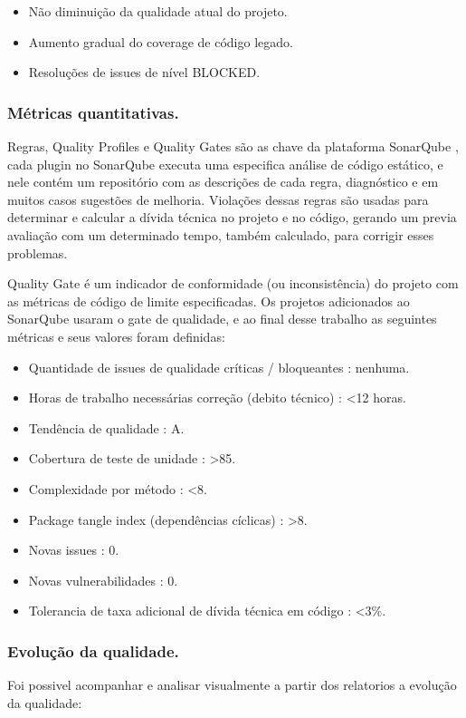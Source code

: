 \documentclass[12pt]{article}
\begin{document}
 \begin{itemize}
 	\item Não diminuição da qualidade atual do projeto.
 	\item Aumento gradual do coverage de código legado.
 	\item Resoluções de issues de nível BLOCKED.
 \end{itemize}

\subsubsection{Métricas quantitativas.} \label{sec:sonar-planning-mquantity}

Regras, Quality Profiles e Quality Gates são as chave da plataforma SonarQube \cite{SONARQUBE}, cada plugin no SonarQube executa uma especifica análise de código estático, e nele contém um repositório com as descrições de cada regra, diagnóstico e em muitos casos sugestões de melhoria.
Violações dessas regras são usadas para determinar e calcular a dívida técnica no projeto e no código, gerando um previa avaliação com um determinado tempo, também calculado, para corrigir esses problemas.

Quality Gate é um indicador de conformidade (ou inconsistência) do projeto com as métricas de código de limite especificadas\cite{SONARQUBE}. Os projetos adicionados ao SonarQube usaram o gate de qualidade, e ao final desse trabalho as seguintes métricas e seus valores foram definidas:

 \begin{itemize}
 	\item Quantidade de issues de qualidade críticas / bloqueantes : nenhuma.
 	\item Horas de trabalho necessárias correção (debito técnico) : \textless 12 horas.
 	\item Tendência de qualidade : A.
 	\item Cobertura de teste de unidade : \textgreater 85.
 	\item Complexidade por método : \textless 8.
 	\item Package tangle index (dependências cíclicas) : \textgreater 8.
	\item Novas issues : 0.
	\item Novas vulnerabilidades : 0.
	\item Tolerancia de taxa adicional de dívida técnica em código : \textless 3\%.
 \end{itemize}

\subsubsection{Evolução da qualidade.} \label{sec:evolucao-mquantity}
Foi possivel acompanhar e analisar visualmente a partir dos relatorios a evolução da qualidade:
\end{document}
